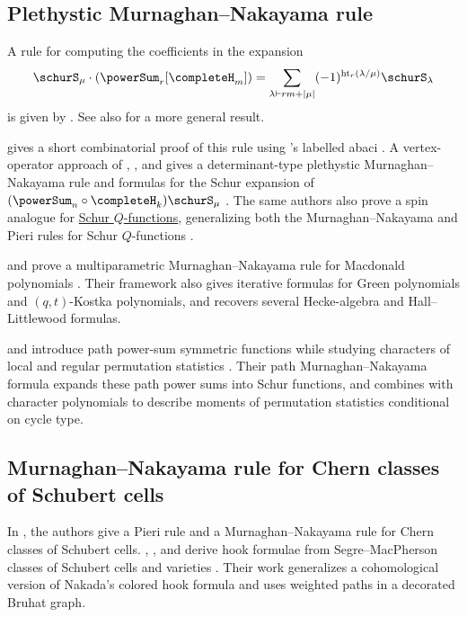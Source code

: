 \subsection[plethysticMNRule]{Plethystic Murnaghan--Nakayama rule}

A rule for computing the coefficients in the expansion
\[
\schurS_\mu \cdot (\powerSum_r[\completeH_m])
=
\sum_{\lambda \vdash rm+|\mu|}
(-1)^{\mathrm{ht}_r(\lambda/\mu)} \schurS_{\lambda}
\]
is given by  \cite{Wildon2016}.  See also
\cite{Wildon2018} for a more general result.

 gives a short combinatorial proof of this rule using
's labelled abaci \cite{Turek2023x}.  A vertex-operator
approach of , , and  gives a
determinant-type plethystic Murnaghan--Nakayama rule and formulas for the
Schur expansion of $(\powerSum_n \circ \completeH_k)\schurS_\mu$
\cite{CaoJingLiu2025}.  The same authors also prove a spin analogue for
\hyperref[schurQ]{Schur $Q$-functions}, generalizing both the
Murnaghan--Nakayama and Pieri rules for Schur $Q$-functions
\cite{CaoJingLiu2024}.

 and  prove a multiparametric
Murnaghan--Nakayama rule for Macdonald polynomials
\cite{JingLiu2024Macdonald}.  Their framework also gives iterative formulas
for Green polynomials and $(q,t)$-Kostka polynomials, and recovers several
Hecke-algebra and Hall--Littlewood formulas.

 and  introduce path power-sum
symmetric functions while studying characters of local and regular
permutation statistics \cite{HamakerRhoades2022x}.  Their path
Murnaghan--Nakayama formula expands these path power sums into Schur
functions, and combines with character polynomials to describe moments of
permutation statistics conditional on cycle type.



\subsection[chernClassMNRule]{Murnaghan--Nakayama rule for Chern classes of
Schubert cells}

In \cite{FanGuoXiong2022x}, the authors give a Pieri rule and a
Murnaghan--Nakayama rule for Chern classes of Schubert cells.
, , and 
derive hook formulae from Segre--MacPherson classes of Schubert cells and
varieties \cite{MihalceaNaruseSu2025}.  Their work generalizes a
cohomological version of Nakada's colored hook formula and uses weighted paths
in a decorated Bruhat graph.

